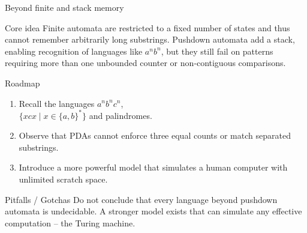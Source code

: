 \begin{frame}[t]{Beyond finite and stack memory}
  \begin{tblock}{Core idea}
    Finite automata are restricted to a fixed number of states and thus
    cannot remember arbitrarily long substrings.  Pushdown automata add a
    stack, enabling recognition of languages like $a^n b^n$, but they still
    fail on patterns requiring more than one unbounded counter or
    non‑contiguous comparisons.
  \end{tblock}
  \begin{tblock}{Roadmap}
    \begin{enumerate}
      \item Recall the languages $a^n b^n c^n$, \\ $\{ x c x \mid x \in \{a,b\}^* \}$ and palindromes.
      \item Observe that PDAs cannot enforce three equal counts or match
        separated substrings.
      \item Introduce a more powerful model that simulates a human
        computer with unlimited scratch space.
    \end{enumerate}
  \end{tblock}
  \begin{talert}{Pitfalls / Gotchas}
    Do not conclude that every language beyond pushdown automata is
    undecidable.  A stronger model exists that can simulate any
    effective computation – the Turing machine.
  \end{talert}
  \label{fr:7.1-01}
\end{frame}


